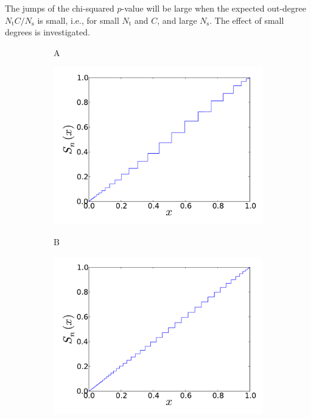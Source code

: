 The jumps of the chi-squared $p$-value will be large when the expected out-degree $N_\text{t} C / N_\text{s}$ is small, i.e., for small $N_\text{t}$ and $C$, and large $N_\text{s}$. The effect of small degrees is investigated. 
\begin{figure}[h]
  \centering
\begin{subfigure}[b]{0.49\textwidth}
	  \begin{flushleft}
	  \large A
		\end{flushleft}
    \centering
    \includegraphics[width=\textwidth]{RCC_distinct_A.pdf}
    \label{subfig:RCC_distinct_A}
\end{subfigure}
\begin{subfigure}[b]{0.49\textwidth}
	  \begin{flushleft}
	  \large B
		\end{flushleft}
    \centering
    \includegraphics[width=\textwidth]{RCC_distinct_B.pdf}

\end{subfigure}
\end{figure}
